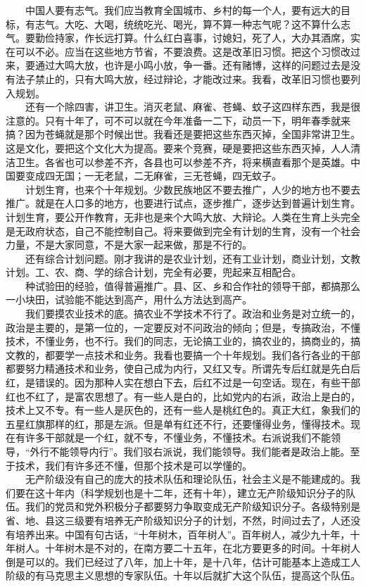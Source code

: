 \documentclass[cn,11pt,chinese]{elegantbook}
\begin{document}
　　中国人要有志气。我们应当教育全国城市、乡村的每一个人，要有远大的目标，有志气。大吃、大喝，统统吃光、喝光，算不算一种志气呢？这不算什么志气。要勤俭持家，作长远打算。什么红白喜事，讨媳妇，死了人，大办其酒席，实在可以不必。应当在这些地方节省，不要浪费。这是改革旧习惯。把这个习惯改过来，要通过大鸣大放，也许是小鸣小放，争一番。还有赌博，这样的问题过去是没有法子禁止的，只有大鸣大放，经过辩论，才能改过来。我看，改革旧习惯也要列入规划。\\
　　还有一个除四害，讲卫生。消灭老鼠、麻雀、苍蝇、蚊子这四样东西，我是很注意的。只有十年了，可不可以就在今年准备一二下，动员一下，明年春季就来搞？因为苍蝇就是那个时候出世。我看还是要把这些东西灭掉，全国非常讲卫生。这是文化，要把这个文化大为提高。要来个竞赛，硬是要把这些东西灭掉，人人清洁卫生。各省也可以参差不齐，各县也可以参差不齐，将来横直看那个是英雄。中国要变成四无国；一无老鼠，二无麻雀，三无苍蝇，四无蚊子。\\
　　计划生育，也来个十年规划。少数民族地区不要去推广，人少的地方也不要去推广。就是在人口多的地方，也要进行试点，逐步推广，逐步达到普遍计划生育。计划生育，要公开作教育，无非也是来个大鸣大放、大辩论。人类在生育上头完全是无政府状态，自己不能控制自己。将来要做到完全有计划的生育，没有一个社会力量，不是大家同意，不是大家一起来做，那是不行的。\\
　　还有综合计划问题。刚才我讲的是农业计划，还有工业计划，商业计划，文教计划。工、农、商、学的综合计划，完全有必要，兜起来互相配合。\\
　　种试验田的经验，值得普遍推广。县、区、乡和合作社的领导干部，都搞那么一小块田，试验能不能达到高产，用什么方法达到高产。\\
　　我们要摸农业技术的底。搞农业不学技术不行了。政治和业务是对立统一的，政治是主要的，是第一位的，一定要反对不问政治的倾向；但是，专搞政治，不懂技术，不懂业务，也不行。我们的同志，无论搞工业的，搞农业的，搞商业的，搞文教的，都要学一点技术和业务。我看也要搞一个十年规划。我们各行各业的干部都要努力精通技术和业务，使自己成为内行，又红又专。所谓先专后红就是先白后红，是错误的。因为那种人实在想白下去，后红不过是一句空话。现在，有些干部红也不红了，是富农思想了。有一些人是白的，比如党内的右派，政治上是白的，技术上又不专。有一些人是灰色的，还有一些人是桃红色的。真正大红，象我们的五星红旗那样的红，那是左派。但是单有红还不行，还要懂得业务，懂得技术。现在有许多干部就是一个红，就不专，不懂业务，不懂技术。右派说我们不能领导，“外行不能领导内行”。我们驳右派说，我们能领导。我们能者是政治上能。至于技术，我们有许多还不懂，但那个技术是可以学懂的。\\
　　无产阶级没有自己的庞大的技术队伍和理论队伍，社会主义是不能建成的。我们要在这十年内（科学规划也是十二年，还有十年），建立无产阶级知识分子的队伍。我们的党员和党外积极分子都要努力争取变成无产阶级知识分子。各级特别是省、地、县这三级要有培养无产阶级知识分子的计划，不然，时间过去了，人还没有培养出来。中国有句古话，“十年树木，百年树人”。百年树人，减少九十年，十年树人。十年树木是不对的，在南方要二十五年，在北方要更多的时间。十年树人倒是可以的。我们已经过了八年，加上十年，是十八年，估计可能基本上造成工人阶级的有马克思主义思想的专家队伍。十年以后就扩大这个队伍，提高这个队伍。\\
\end{document}
